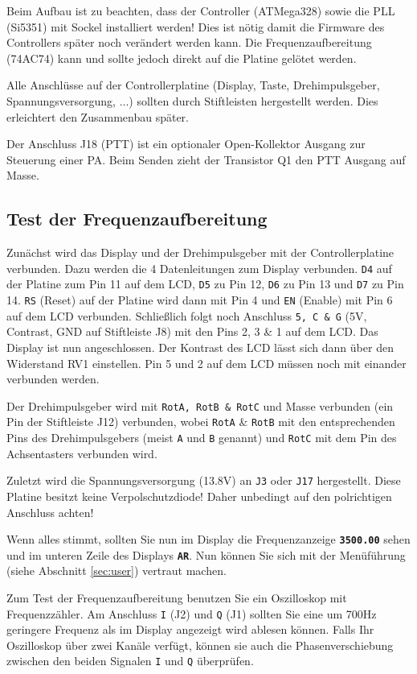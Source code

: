 \documentclass[10pt, a4paper]{paper}
\newcommand{\warn}[1]{{\color{red} #1}}
\newcommand{\con}[1]{\texttt{#1}}
\newcommand{\dis}[1]{\textbf{\texttt{#1}}}
\begin{document}
Beim Aufbau ist zu beachten, \warn{dass der Controller (ATMega328) sowie die PLL (Si5351) mit Sockel installiert werden!} Dies ist nötig damit die Firmware des Controllers später noch verändert werden kann. Die Frequenzaufbereitung (74AC74) kann und sollte jedoch direkt auf die Platine gelötet werden. 

Alle Anschlüsse auf der Controllerplatine (Display, Taste, Drehimpulsgeber, Spannungsversorgung, ...) sollten durch Stiftleisten hergestellt werden. Dies erleichtert den Zusammenbau später.

Der Anschluss J18 (PTT) ist ein optionaler Open-Kollektor Ausgang zur Steuerung einer PA. Beim Senden zieht der Transistor Q1 den PTT Ausgang auf Masse.


\subsection{Test der Frequenzaufbereitung}
Zunächst wird das Display und der Drehimpulsgeber mit der Controllerplatine verbunden. Dazu werden die 4 Datenleitungen zum Display verbunden. \con{D4} auf der Platine zum Pin 11 auf dem LCD, \con{D5} zu Pin 12, \con{D6} zu Pin 13 und \con{D7} zu Pin 14. \con{RS} (Reset) auf der Platine wird dann mit Pin 4 und \con{EN} (Enable) mit Pin 6 auf dem LCD verbunden. Schließlich folgt noch Anschluss \con{5, C \& G} (5V, Contrast, GND auf Stiftleiste J8) mit den Pins 2, 3 \& 1 auf dem LCD. Das Display ist nun angeschlossen. Der Kontrast des LCD lässt sich dann über den Widerstand RV1 einstellen. \warn{Pin 5 und 2 auf dem LCD müssen noch mit einander verbunden werden.}

Der Drehimpulsgeber wird mit \con{RotA, RotB \& RotC} und Masse verbunden (ein Pin der Stiftleiste J12) verbunden, wobei \con{RotA} \& \con{RotB} mit den entsprechenden Pins des Drehimpulsgebers (meist \con{A} und \con{B} genannt) und \con{RotC} mit dem Pin des Achsentasters verbunden wird. 

Zuletzt wird die Spannungsversorgung (13.8V) an \con{J3} oder \con{J17} hergestellt. \warn{Diese Platine besitzt keine Verpolschutzdiode! Daher unbedingt auf den polrichtigen Anschluss achten!}

Wenn alles stimmt, sollten Sie nun im Display die Frequenzanzeige \dis{3500.00} sehen und im unteren Zeile des Displays \dis{AR}. Nun können Sie sich mit der Menüführung (siehe Abschnitt \ref{sec:user}) vertraut machen. 

Zum Test der Frequenzaufbereitung benutzen Sie ein Oszilloskop mit Frequenzzähler. Am Anschluss \con{I} (J2) und \con{Q} (J1) sollten Sie eine um 700Hz geringere Frequenz als im Display angezeigt wird ablesen können. Falls Ihr Oszilloskop über zwei Kanäle verfügt, können sie auch die Phasenverschiebung zwischen den beiden Signalen \con{I} und \con{Q} überprüfen. 
\end{document}
